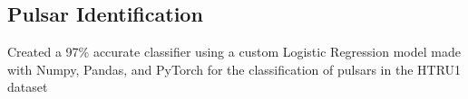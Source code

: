 \documentclass[]{resume-template}
\begin{document}
\begin{minipage}[t]{0.66\textwidth}
        \subsection{Pulsar Identification}\label{subsec:pulsar-identification}
        \begin{tightemize}
            \item Created a 97\% accurate classifier using a custom Logistic Regression model made with Numpy, Pandas, and PyTorch for the classification of pulsars in the HTRU1 dataset
        \end{tightemize}


        \sectionsep{}







\end{minipage}
\end{document}
